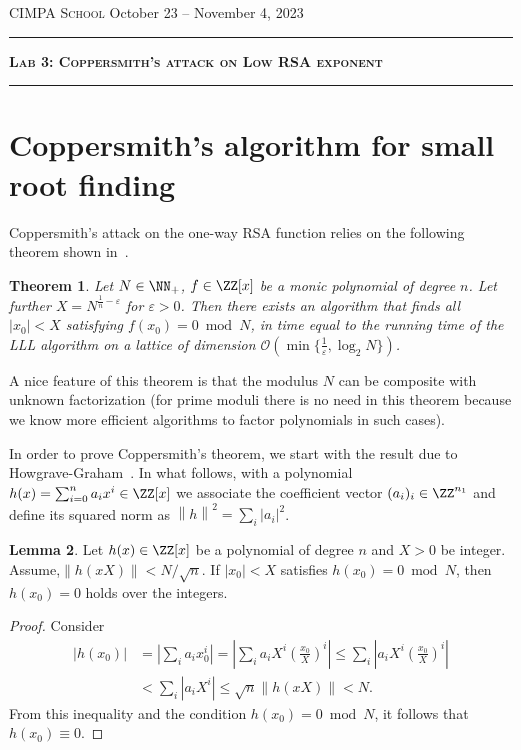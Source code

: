 \documentclass[11pt]{exam}
\newtheorem{theorem}{Theorem}
\theoremstyle{definition}
\newtheorem{lemma}[theorem]{Lemma}
\newcommand{\bigO}{\mathcal{O}}
\newcommand*\abs[1]{\left\lvert#1\right\rvert}
\newcommand*\norm[1]{\left\lVert#1\right\rVert}
\begin{document}
	{\noindent
		\textsc{CIMPA School}
		\hfill {October 23 -- November 4, 2023\\}
		\hrule
		\begin{center}
			{\Large\textbf{
					\textsc{Lab 3: Coppersmith's attack on Low RSA exponent} \\[5pt]
			} } 
		\end{center}
	}
	\hrule \vspace{5mm}
	
	\thispagestyle{empty}
	
	\vspace{0.2cm}
	
	\thispagestyle{empty}
	
	\vspace{0.2cm}
	\section{ Coppersmith's algorithm for small root finding}
	Coppersmith's attack on the one-way RSA function relies on the following theorem shown in~\cite{Coppersmith}.
	\begin{theorem}\label{thm:Coppersmith}
		Let $N\in \NN_+$, $f\in \ZZ[x]$ be a monic polynomial of degree $n$. Let further $X = N^{\frac{1}{n}-\varepsilon}$ for $\varepsilon>0$. Then there exists an algorithm that finds all $|x_0| < X$ satisfying $f(x_0) =0 \bmod N$, in time equal to the running time of the LLL algorithm on a lattice of dimension $\bigO(\min\{ \frac{1}{\varepsilon}, \log_2 N \})$.
	\end{theorem}

	A nice feature of this theorem is that the modulus $N$ can be composite with unknown factorization (for prime moduli there is no need in this theorem because we know more efficient algorithms to factor polynomials in such cases).
	
	In order to prove Coppersmith's theorem, we start with the result due to Howgrave-Graham~\cite{HG}. In what follows, with a polynomial $h(x) = \sum_{i=0}^{n} a_i x^i \in \ZZ[x]$ we associate the coefficient vector $(a_i)_i\in \ZZ^{n_1}$ and define its squared norm as $\norm{h}^2 = \sum_i \abs{a_i}^2$.
 
	\begin{lemma}\label{lem:HG}
		Let $h(x) \in \ZZ[x]$ be a polynomial of degree $n$ and $X>0$ be integer. Assume,$\norm{h(xX)} < N / \sqrt{n}$. If $\abs{x_0} < X$ satisfies $h(x_0) = 0 \bmod N$, then $h(x_0) = 0$ holds over the integers.
	\end{lemma}
	\begin{proof}
		Consider
	\begin{align*}
		\abs{h(x_0)} &=\abs{\sum_i a_i x^i_0} = \abs{ \sum_i a_i X^i \left( \frac{x_0}{X} \right)^i} \leq \sum_i \abs{a_i X^i \left( \frac{x_0}{X} \right)^i} \\
		& < \sum_i \abs{a_i X^i} \leq \sqrt{n} \norm{h(xX)} < N. 
	\end{align*}
	From this inequality and the condition $h(x_0) = 0 \bmod N$, it follows that $h(x_0) \equiv 0$.  
	\end{proof}
\end{document}
